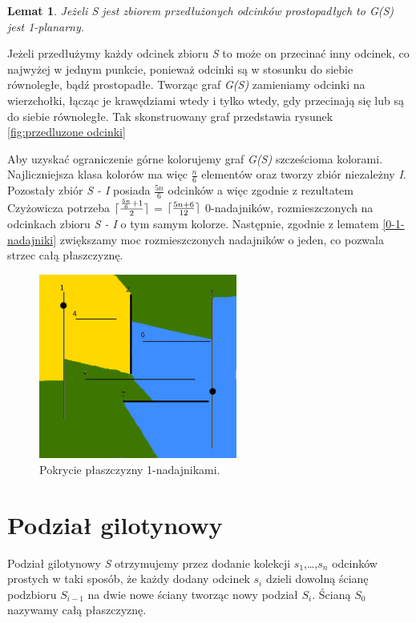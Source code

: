 \documentclass[brudnopis]{xmgr}
\DeclarePairedDelimiter\ceil{\lceil}{\rceil}
\newtheorem{Lemat}{Lemat}
\begin{document}
\begin{Lemat}
  Jeżeli S jest zbiorem przedłużonych odcinków prostopadłych to G(S) jest \textit{1-planarny}.
\end{Lemat}
\indent Jeżeli przedłużymy każdy odcinek zbioru \textit{S} to może on przecinać inny odcinek, co najwyżej w jednym punkcie, ponieważ odcinki są w stosunku do siebie równoległe, bądź prostopadłe. Tworząc graf \textit{G(S)} zamieniamy odcinki na wierzchołki, łącząc je krawędziami wtedy i tylko wtedy, gdy przecinają się lub są do siebie równoległe. Tak skonstruowany graf przedstawia rysunek \ref{fig:przedluzone odcinki}

\indent Aby uzyskać ograniczenie górne kolorujemy graf \textit{G(S)} szcześcioma kolorami. Najliczniejsza klasa kolorów ma więc $\frac{n}{6}$ elementów oraz tworzy zbiór niezależny \textit{I}. Pozostały zbiór \textit{S - I} posiada $\frac{5n}{6}$ odcinków a więc zgodnie z rezultatem Czyżowicza potrzeba $\ceil{\frac{\frac{5n}{6} + 1}{2}}$ = $\ceil{\frac{5n+6}{12}}$ 0-nadajników, rozmieszczonych na odcinkach zbioru \textit{S - I} o tym samym kolorze. Następnie, zgodnie z lematem \ref{0-1-nadajniki} zwiększamy moc rozmieszczonych nadajników o jeden, co pozwala strzec całą płaszczyznę.
\begin{figure}[ht!]
  \centering
  \includegraphics[width=6.5cm]{rysunki/pokrycie_nadajnikami.png}
  \caption{Pokrycie płaszczyzny 1-nadajnikami.}
  \label{fig:pokrycie plaszczyzny}
\end{figure} 

\section{Podział gilotynowy}
Podział gilotynowy \textit{S} otrzymujemy przez dodanie kolekcji $s_1$,\ldots,$s_n$ odcinków prostych w taki sposób, że każdy dodany odcinek $s_i$ dzieli dowolną ścianę podzbioru $S_{i-1}$ na dwie nowe ściany tworząc nowy podział $S_i$. Ścianą $S_0$ nazywamy całą płaszczyznę.
\end{document}
